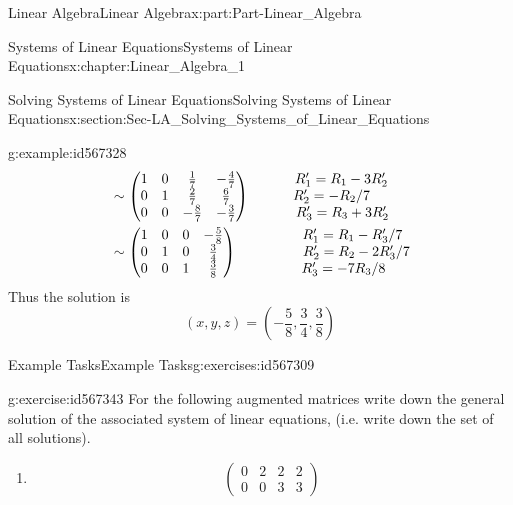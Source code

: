 \documentclass[oneside,10pt,]{book}
\numberwithin{equation}{section}
\newcommand{\amp}{&}
\begin{document}
\begin{partptx}{Linear Algebra}{}{Linear Algebra}{}{}{x:part:Part-Linear_Algebra}
\begin{chapterptx}{Systems of Linear Equations}{}{Systems of Linear Equations}{}{}{x:chapter:Linear_Algebra_1}
\begin{sectionptx}{Solving Systems of Linear Equations}{}{Solving Systems of Linear Equations}{}{}{x:section:Sec-LA_Solving_Systems_of_Linear_Equations}
\begin{example}{}{g:example:id567328}
\begin{align*}
\amp \sim \begin{pmatrix} 1 \amp 0 \amp \frac{1}{7} \amp -\frac{4}{7} \\ 0 \amp 1 \amp \frac{2}{7} \amp \frac{6}{7} \\ 0 \amp 0 \amp -\frac{8}{7} \amp -\frac{3}{7} \end{pmatrix}  \hspace{6mm} \begin{matrix} \hspace{5mm} R_1'=R_1-3R_2' \\  R_2'=-R_2/7 \\ \hspace{5.5mm} R_3'=R_3+3R_2' \end{matrix}\\
\amp \sim \begin{pmatrix} 1 \amp 0 \amp 0 \amp -\frac{5}{8} \\ 0 \amp 1 \amp 0 \amp \frac{3}{4} \\ 0 \amp 0 \amp 1 \amp \frac{3}{8} \end{pmatrix}   \begin{matrix} \hspace{14.5mm} R_1'=R_1-R_3'/7 \\ \hspace{16.5mm} R_2'=R_2-2R_3'/7 \\ \hspace{10mm} R_3'=-7R_3/8 \end{matrix}
\end{align*}
Thus the solution is%
\begin{equation*}
(x,y,z)=\left(-\frac{5}{8},\frac{3}{4},\frac{3}{8}\right)
\end{equation*}
%
\end{example}
%
%
\typeout{************************************************}
\typeout{************************************************}
%
\begin{exercises-subsection-numberless}{Example Tasks}{}{Example Tasks}{}{}{g:exercises:id567309}
\begin{divisionexercise}{1}{}{}{g:exercise:id567343}%
For the following augmented matrices write down the general solution of the associated system of linear equations, (i.e. write down the set of all solutions).%
\par
%
\begin{enumerate}[label=(\alph*).]
\item{}%
\begin{equation*}
\begin{pmatrix} 0 \amp 2 \amp 2 \amp 2 \\ 0 \amp 0 \amp 3 \amp 3\end{pmatrix} 

\end{equation*}
\end{enumerate}
\end{divisionexercise}
\end{exercises-subsection-numberless}
\end{sectionptx}
\end{chapterptx}
\end{partptx}
\end{document}
